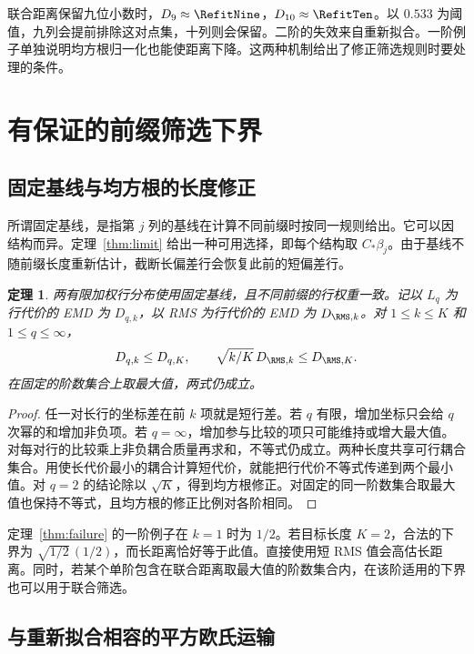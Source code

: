 \documentclass[11pt,a4paper,UTF8,fontset=fandol]{ctexart}
\newtheorem{theorem}{定理}
\theoremstyle{definition}
\begin{document}
联合距离保留九位小数时，\(D_9\approx\RefitNine\)，\(D_{10}\approx\RefitTen\)。以 \(0.533\) 为阈值，九列会提前排除这对点集，十列则会保留。二阶的失效来自重新拟合。一阶例子单独说明均方根归一化也能使距离下降。这两种机制给出了修正筛选规则时要处理的条件。

\section{有保证的前缀筛选下界}\label{sec:screening}

\subsection{固定基线与均方根的长度修正}

所谓固定基线，是指第 \(j\) 列的基线在计算不同前缀时按同一规则给出。它可以因结构而异。定理~\ref{thm:limit} 给出一种可用选择，即每个结构取 \(C_*\beta_j\)。由于基线不随前缀长度重新估计，截断长偏差行会恢复此前的短偏差行。

\begin{theorem}\label{thm:fixed}
两有限加权行分布使用固定基线，且不同前缀的行权重一致。记以 \(L_q\) 为行代价的 EMD 为 \(D_{q,k}\)，以 RMS 为行代价的 EMD 为 \(D_{\RMS,k}\)。对 \(1\le k\le K\) 和 \(1\le q\le\infty\)，
\begin{equation}\label{eq:fixed}
D_{q,k}\le D_{q,K},\qquad
\sqrt{k/K}\,D_{\RMS,k}\le D_{\RMS,K}.
\end{equation}
在固定的阶数集合上取最大值，两式仍成立。
\end{theorem}

\begin{proof}
任一对长行的坐标差在前 \(k\) 项就是短行差。若 \(q\) 有限，增加坐标只会给 \(q\) 次幂的和增加非负项。若 \(q=\infty\)，增加参与比较的项只可能维持或增大最大值。对每对行的比较乘上非负耦合质量再求和，不等式仍成立。两种长度共享可行耦合集合。用使长代价最小的耦合计算短代价，就能把行代价不等式传递到两个最小值。对 \(q=2\) 的结论除以 \(\sqrt K\)，得到均方根修正。对固定的同一阶数集合取最大值也保持不等式，且均方根的修正比例对各阶相同。
\end{proof}

定理~\ref{thm:failure} 的一阶例子在 \(k=1\) 时为 \(1/2\)。若目标长度 \(K=2\)，合法的下界为 \(\sqrt{1/2}\,(1/2)\)，而长距离恰好等于此值。直接使用短 RMS 值会高估长距离。同时，若某个单阶包含在联合距离取最大值的阶数集合内，在该阶适用的下界也可以用于联合筛选。

\subsection{与重新拟合相容的平方欧氏运输}
\end{document}
